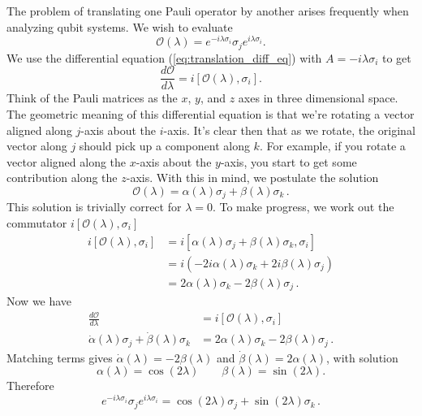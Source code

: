 The problem of translating one Pauli operator by another arises frequently when analyzing qubit systems.
We wish to evaluate
\begin{equation}
  \mathcal{O}(\lambda) = e^{-i\lambda\sigma_i}\sigma_j e^{i\lambda\sigma_i}.
\end{equation}
We use the differential equation (\ref{eq:translation_diff_eq}) with $A=-i\lambda\sigma_i$ to get
\begin{equation}
  \frac{d\mathcal{O}}{d\lambda} = i[\mathcal{O}(\lambda),\sigma_i].
\end{equation}
Think of the Pauli matrices as the $x$, $y$, and $z$ axes in three dimensional space.
The geometric meaning of this differential equation is that we're rotating a vector aligned along $j$-axis about the $i$-axis.
It's clear then that as we rotate, the original vector along $j$ should pick up a component along $k$.
For example, if you rotate a vector aligned along the $x$-axis about the $y$-axis, you start to get some contribution along the $z$-axis.
With this in mind, we postulate the solution
\begin{equation}
  \mathcal{O}(\lambda) = \alpha(\lambda)\sigma_j + \beta(\lambda)\sigma_k \, .
\end{equation}
This solution is trivially correct for $\lambda = 0$.
To make progress, we work out the commutator $i[\mathcal{O}(\lambda),\sigma_i]$
\begin{align*}
  i[\mathcal{O}(\lambda),\sigma_i]
    &= i[\alpha(\lambda) \sigma_j + \beta(\lambda) \sigma_k, \sigma_i] \\
    &= i \left( -2i\alpha(\lambda) \sigma_k + 2i\beta(\lambda) \sigma_j \right) \\
    &= 2\alpha(\lambda) \sigma_k - 2\beta(\lambda) \sigma_j \, .
\end{align*}
Now we have
\begin{align*}
  \frac{d\mathcal{O}}{d\lambda}
    &= i \left[ \mathcal{O}(\lambda), \sigma_i \right] \\
  \dot{\alpha}(\lambda)\sigma_j + \dot{\beta}(\lambda) \sigma_k
    &= 2 \alpha(\lambda)\sigma_k - 2 \beta(\lambda) \sigma_j \, .
\end{align*}
Matching terms gives $\dot{\alpha}(\lambda) = -2\beta(\lambda)$ and $\dot{\beta}(\lambda) = 2\alpha(\lambda)$, with solution
\begin{equation}
  \alpha(\lambda) = \cos \left( 2\lambda \right) \qquad \beta(\lambda) = \sin \left( 2\lambda \right). \nonumber
\end{equation}
Therefore
\begin{equation}
  e^{-i\lambda\sigma_i}\sigma_j e^{i\lambda\sigma_i} = \cos \left( 2\lambda \right) \sigma_j + \sin \left( 2\lambda \right) \sigma_k \, .
\end{equation}
